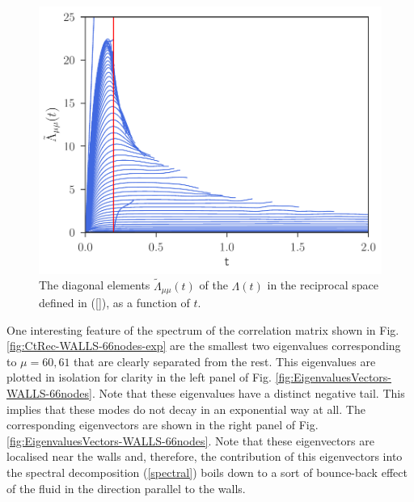 \documentclass[a4paper,openright,12pt]{book}
\begin{document}
\begin{figure}[h!]
  \centering
\includegraphics[scale=0.45]{LambdatRec-WALLS-66nodes}
\caption[Diagonal elements  $\tilde{\Lambda}_{\mu\mu}(t)$ of $\Lambda(t)$ in the reciprocal space - 66nodes.]{The  diagonal elements  $\tilde{\Lambda}_{\mu\mu}(t)$ of  the
  $\Lambda(t)$ in the reciprocal space defined in (\ref{}), as a
  function of $t$.}
\label{fig:LambdatRec-WALLS-66nodes}
\end{figure}

One  interesting feature  of the  spectrum of  the correlation  matrix
shown  in  Fig.  \ref{fig:CtRec-WALLS-66nodes-exp}  are  the  smallest two  eigenvalues
corresponding to $\mu=60,61$  that are clearly separated from the rest.
This eigenvalues are plotted in isolation for clarity in the left panel
of  Fig.  \ref{fig:EigenvaluesVectors-WALLS-66nodes}.   Note that  these eigenvalues  have a
distinct negative tail. This implies that  these modes do not decay in
an exponential way at all. The corresponding eigenvectors are shown in
the  right  panel of  Fig.   \ref{fig:EigenvaluesVectors-WALLS-66nodes}.   Note that  these
eigenvectors  are  localised  near   the  walls  and,  therefore,  the
contribution  of this  eigenvectors  into  the spectral  decomposition
(\ref{spectral}) boils  down to  a sort of  bounce-back effect  of the
fluid in the direction parallel to the walls.
\end{document}

